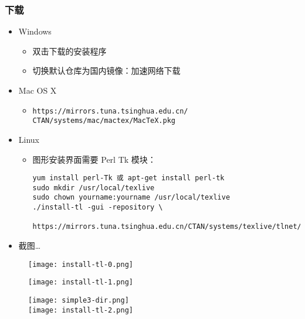 \begin{frame}[fragile]
  \frametitle{下载}
  \begin{itemize}
    \item Windows
      \begin{itemize}
        \item 双击下载的安装程序
        \item 切换默认仓库为国内镜像：加速网络下载
      \end{itemize}
    \item Mac OS X
      \begin{itemize}
        \item \texttt{https://mirrors.tuna.tsinghua.edu.cn/\\CTAN/systems/mac/mactex/MacTeX.pkg}
      \end{itemize}
    \item Linux
      \begin{itemize}
        \item 图形安装界面需要 Perl Tk 模块：
          \begin{lstlisting}
yum install perl-Tk 或 apt-get install perl-tk
sudo mkdir /usr/local/texlive
sudo chown yourname:yourname /usr/local/texlive
./install-tl -gui -repository \
  https://mirrors.tuna.tsinghua.edu.cn/CTAN/systems/texlive/tlnet/
        \end{lstlisting}
      \end{itemize}
\item 截图\dots
\end{itemize}
\end{frame}

\begin{frame}
  \begin{figure}[h]
    \centering
    \texttt{[image: install-tl-0.png]}
  \end{figure}
\end{frame}

\begin{frame}
  \begin{figure}[h]
    \centering
    \texttt{[image: install-tl-1.png]}
  \end{figure}
\end{frame}

\begin{frame}
  \begin{figure}[h]
    \centering
    \texttt{[image: simple3-dir.png]}\\
    \texttt{[image: install-tl-2.png]}
  \end{figure}
\end{frame}

